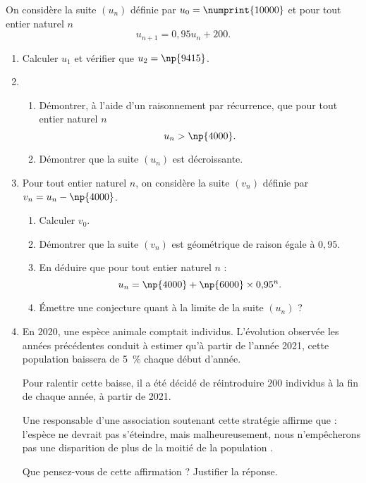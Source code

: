 \documentclass[french,no-indent,FontSize=11pt]{tango}
\begin{document}
 



On considère la suite $\left(u_n\right)$ définie par $u_0 = \numprint{10000}$ et pour tout entier naturel $n$
\[u_{n+1} = 0{,}95u_n + 200.\]

\begin{enumerate}
\item Calculer $u_1$ et vérifier que $u_2 = \np{9415}$. 
\item 
	\begin{enumerate}
		\item Démontrer, à l'aide d'un raisonnement par récurrence, que pour tout entier naturel $n$
\[u_n >\np{4000}.\]
\item Démontrer que la suite $\left(u_n\right)$ est décroissante. 		 	\end{enumerate}
\item  Pour tout entier naturel $n$, on considère la suite $\left(v_n\right)$ définie par $v_n = u_n -  \np{4000}$.
	\begin{enumerate}
		\item Calculer $v_0$.
		\item Démontrer que la suite $\left(v_n\right)$ est géométrique de raison égale à $0{,}95$.
		\item En déduire que pour tout entier naturel $n$ :
\[u_n = \np{4000} + \np{6000} \times 0{,}95^n.\]
		\item Émettre une conjecture quant à la limite de la suite $\left(u_n\right)$ ? 
	\end{enumerate}
\item En 2020, une espèce animale comptait  individus. L'évolution observée les années précédentes conduit à estimer qu'à partir de l'année 2021, cette population baissera de 5~\% chaque début d'année.

Pour ralentir cette baisse, il a été décidé de réintroduire $200$ individus à  la fin de chaque année, à partir de 2021.

Une responsable d'une association soutenant cette stratégie affirme que : \og l'espèce ne devrait pas s'éteindre, mais malheureusement, nous n'empêcherons pas une disparition de plus de la moitié de la population \fg.

Que pensez-vous de cette affirmation ? Justifier la réponse.
\end{enumerate}



\end{document}
